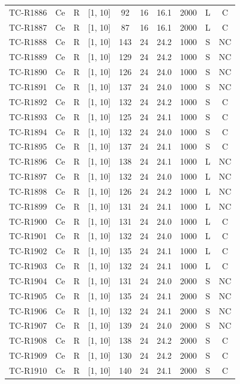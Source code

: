 \begin{longtable}{lccccccccc}
TC-R1886 & Ce & R & [1, 10] & 92 & 16 & 16.1 & 2000 & L & C \\
TC-R1887 & Ce & R & [1, 10] & 87 & 16 & 16.1 & 2000 & L & C \\
TC-R1888 & Ce & R & [1, 10] & 143 & 24 & 24.2 & 1000 & S & NC \\
TC-R1889 & Ce & R & [1, 10] & 129 & 24 & 24.2 & 1000 & S & NC \\
TC-R1890 & Ce & R & [1, 10] & 126 & 24 & 24.0 & 1000 & S & NC \\
TC-R1891 & Ce & R & [1, 10] & 137 & 24 & 24.0 & 1000 & S & NC \\
TC-R1892 & Ce & R & [1, 10] & 132 & 24 & 24.2 & 1000 & S & C \\
TC-R1893 & Ce & R & [1, 10] & 125 & 24 & 24.1 & 1000 & S & C \\
TC-R1894 & Ce & R & [1, 10] & 132 & 24 & 24.0 & 1000 & S & C \\
TC-R1895 & Ce & R & [1, 10] & 137 & 24 & 24.1 & 1000 & S & C \\
TC-R1896 & Ce & R & [1, 10] & 138 & 24 & 24.1 & 1000 & L & NC \\
TC-R1897 & Ce & R & [1, 10] & 132 & 24 & 24.0 & 1000 & L & NC \\
TC-R1898 & Ce & R & [1, 10] & 126 & 24 & 24.2 & 1000 & L & NC \\
TC-R1899 & Ce & R & [1, 10] & 131 & 24 & 24.1 & 1000 & L & NC \\
TC-R1900 & Ce & R & [1, 10] & 131 & 24 & 24.0 & 1000 & L & C \\
TC-R1901 & Ce & R & [1, 10] & 132 & 24 & 24.0 & 1000 & L & C \\
TC-R1902 & Ce & R & [1, 10] & 135 & 24 & 24.1 & 1000 & L & C \\
TC-R1903 & Ce & R & [1, 10] & 132 & 24 & 24.1 & 1000 & L & C \\
TC-R1904 & Ce & R & [1, 10] & 131 & 24 & 24.0 & 2000 & S & NC \\
TC-R1905 & Ce & R & [1, 10] & 135 & 24 & 24.1 & 2000 & S & NC \\
TC-R1906 & Ce & R & [1, 10] & 132 & 24 & 24.1 & 2000 & S & NC \\
TC-R1907 & Ce & R & [1, 10] & 139 & 24 & 24.0 & 2000 & S & NC \\
TC-R1908 & Ce & R & [1, 10] & 138 & 24 & 24.2 & 2000 & S & C \\
TC-R1909 & Ce & R & [1, 10] & 130 & 24 & 24.2 & 2000 & S & C \\
TC-R1910 & Ce & R & [1, 10] & 140 & 24 & 24.1 & 2000 & S & C \\

\end{longtable}
